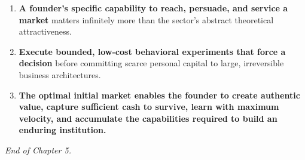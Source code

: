 \begin{enumerate}[leftmargin=16pt,itemsep=3pt,topsep=2pt]
  \item \textbf{A founder's specific capability to reach, persuade, and service a market} matters infinitely more than the sector's abstract theoretical attractiveness.
  \item \textbf{Execute bounded, low-cost behavioral experiments that force a decision} before committing scarce personal capital to large, irreversible business architectures.
  \item \textbf{The optimal initial market enables the founder to create authentic value, capture sufficient cash to survive, learn with maximum velocity, and accumulate the capabilities required to build an enduring institution.}
\end{enumerate}

\vspace{1em}
\begin{center}
\small\itshape\color{BayesSecondary}
End of Chapter 5.
\end{center}
